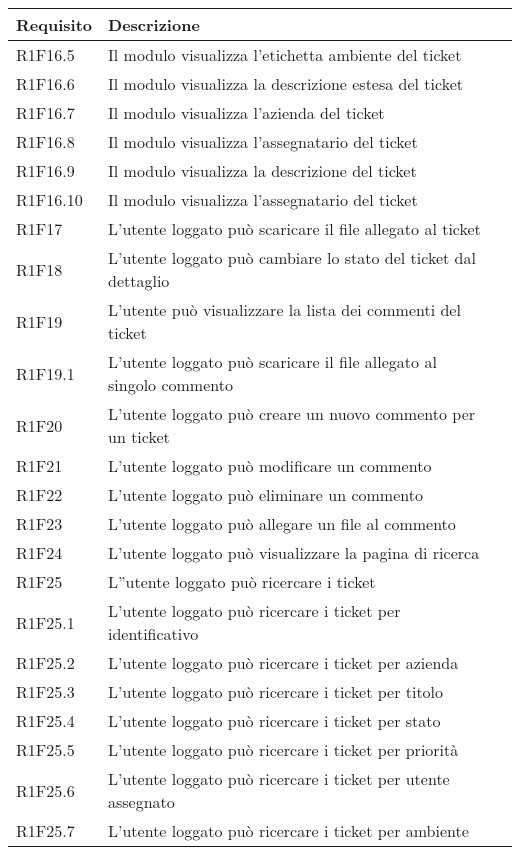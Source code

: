 \begin{table}[H]
{\renewcommand{\arraystretch}{2}
\begin{tabularx}{\textwidth}{PXl}
\hline\hline
\textbf{Requisito} & \textbf{Descrizione}\\
\hline

R1F16.5 & Il modulo visualizza l'etichetta ambiente del ticket\\
\hline
R1F16.6 & Il modulo visualizza la descrizione estesa del ticket\\
\hline
R1F16.7 & Il modulo visualizza l'azienda del ticket\\
\hline
R1F16.8 & Il modulo visualizza l'assegnatario del ticket\\
\hline
R1F16.9 & Il modulo visualizza la descrizione del ticket\\
\hline
R1F16.10 & Il modulo visualizza l'assegnatario del ticket\\
\hline
R1F17 & L'utente loggato può scaricare il file allegato al ticket\\
\hline
R1F18 & L'utente loggato può cambiare lo stato del ticket dal dettaglio\\
\hline
R1F19 & L'utente può visualizzare la lista dei commenti del ticket\\
\hline
R1F19.1 & L'utente loggato può scaricare il file allegato al singolo commento\\
\hline
R1F20 & L'utente loggato può creare un nuovo commento per un ticket\\
\hline
R1F21 & L'utente loggato può modificare un commento\\
\hline
R1F22 & L'utente loggato può eliminare un commento\\
\hline
R1F23 & L'utente loggato può allegare un file al commento\\
\hline
R1F24 & L'utente loggato può visualizzare la pagina di ricerca\\
\hline

R1F25 & L''utente loggato può ricercare i ticket\\
\hline
R1F25.1 & L'utente loggato può ricercare i ticket per identificativo\\
\hline
R1F25.2 & L'utente loggato può ricercare i ticket per azienda\\
\hline
R1F25.3 & L'utente loggato può ricercare i ticket per titolo\\
\hline
R1F25.4 & L'utente loggato può ricercare i ticket per stato\\
\hline
R1F25.5 & L'utente loggato può ricercare i ticket per priorità\\
\hline
R1F25.6 & L'utente loggato può ricercare i ticket per utente assegnato\\
\hline
R1F25.7 & L'utente loggato può ricercare i ticket per ambiente\\
\hline
\end{tabularx}
}
\end{table}

